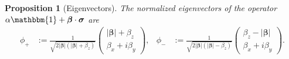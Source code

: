 \documentclass[12pt]{article}
\newtheorem{prop}[thm]{Proposition}
\begin{document}
\begin{prop}[Eigenvectors]
  The normalized eigenvectors of the operator $\alpha \mathbbm{1} + \bm{\beta} \cdot
\bm{\sigma}$ are 
  \begin{align*}
    \phi_{+}
    &:= \frac{1}{\sqrt{2|\bm{\beta}| (|\bm{\beta}|+\beta_z)}}
    \begin{pmatrix}
      |\bm{\beta}|+\beta_z \\
      \beta_x+i\beta_y
    \end{pmatrix},
    &
    \phi_{-}
    &:= \frac{1}{\sqrt{2|\bm{\beta}|(|\bm{\beta}|-\beta_z)}}
    \begin{pmatrix}
      \beta_z - |\bm{\beta}|\\
      \beta_x+i\beta_y
    \end{pmatrix}.
  \end{align*}
\end{prop}
\end{document}

